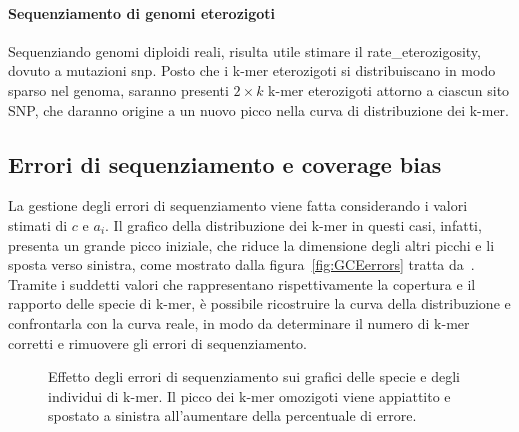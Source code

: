 \documentclass[crop=false, class=book]{standalone}
\begin{document}
	\paragraph{Sequenziamento di genomi eterozigoti}
	Sequenziando genomi diploidi reali, risulta utile stimare il \gls{rate_eterozigosity}, dovuto a mutazioni \gls{snp}. Posto che i k-mer eterozigoti si distribuiscano in modo sparso nel genoma, saranno presenti $2\times k$ k-mer eterozigoti attorno a ciascun sito SNP, che daranno origine a un nuovo picco nella curva di distribuzione dei k-mer. 
	
	\subsection{Errori di sequenziamento e coverage bias}
	La gestione degli errori di sequenziamento viene fatta considerando i valori stimati di $c$ e $a_i$. Il grafico della distribuzione dei k-mer in questi casi, infatti, presenta un grande picco iniziale, che riduce la dimensione degli altri picchi e li sposta verso sinistra, come mostrato dalla figura~\vref{fig:GCEerrors} tratta da~\cite{liu2013GCE}. Tramite i suddetti valori che rappresentano rispettivamente la copertura e il rapporto delle specie di k-mer, è possibile ricostruire la curva della distribuzione e confrontarla con la curva reale, in modo da determinare il numero di k-mer corretti e rimuovere gli errori di sequenziamento.
	
	\begin{figure}[]
		\centering
		 \quad
		\caption{Effetto degli errori di sequenziamento sui grafici delle specie e degli individui di k-mer. Il picco dei k-mer omozigoti viene appiattito e spostato a sinistra all'aumentare della percentuale di errore.}
		\label{fig:GCEerrors}
	\end{figure}
	
\end{document}
